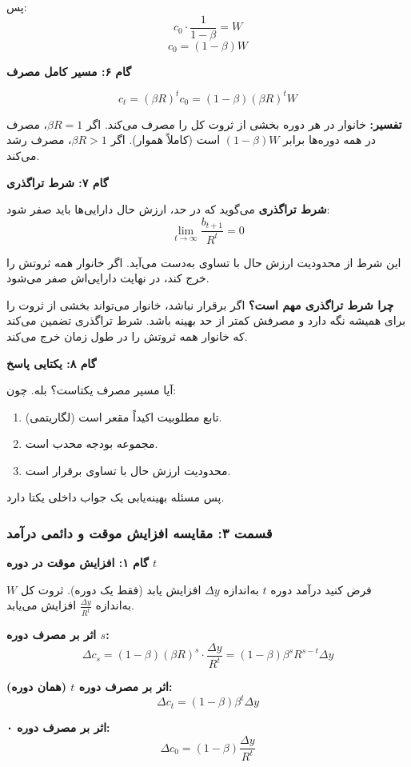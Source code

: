 \documentclass[12pt,a4paper]{article}
\begin{document}
پس:
\[
	c_0 \cdot \frac{1}{1-\beta} = W
\]
\[
	\boxed{c_0 = (1-\beta) W}
\]

\textbf{گام ۶: مسیر کامل مصرف}

\[
	\boxed{c_t = (\beta R)^t c_0 = (1-\beta)(\beta R)^t W}
\]

\textbf{تفسیر:} خانوار در هر دوره بخشی از ثروت کل را مصرف می‌کند. اگر $\beta R = 1$، مصرف در همه دوره‌ها برابر $(1-\beta)W$ است (کاملاً هموار). اگر $\beta R > 1$، مصرف رشد می‌کند.

\textbf{گام ۷: شرط تراگذری}

\textbf{شرط تراگذری} می‌گوید که در حد، ارزش حال دارایی‌ها باید صفر شود:
\[
	\lim_{t \to \infty} \frac{b_{t+1}}{R^t} = 0
\]

این شرط از محدودیت ارزش حال با تساوی به‌دست می‌آید. اگر خانوار همه ثروتش را خرج کند، در نهایت دارایی‌اش صفر می‌شود.

\textbf{چرا شرط تراگذری مهم است؟} اگر برقرار نباشد، خانوار می‌تواند بخشی از ثروت را برای همیشه نگه دارد و مصرفش کمتر از حد بهینه باشد. شرط تراگذری تضمین می‌کند که خانوار همه ثروتش را در طول زمان خرج می‌کند.

\textbf{گام ۸: یکتایی پاسخ}

آیا مسیر مصرف یکتاست؟ بله. چون:

\begin{enumerate}
	\item تابع مطلوبیت اکیداً مقعر است (لگاریتمی).
	\item مجموعه بودجه محدب است.
	\item محدودیت ارزش حال با تساوی برقرار است.
\end{enumerate}

پس مسئله بهینه‌یابی یک جواب داخلی یکتا دارد.

\subsubsection{قسمت ۳: مقایسه افزایش موقت و دائمی درآمد}

\textbf{گام ۱: افزایش موقت در دوره $t$}

فرض کنید درآمد دوره $t$ به‌اندازه $\Delta y$ افزایش یابد (فقط یک دوره). ثروت کل $W$ به‌اندازه $\frac{\Delta y}{R^t}$ افزایش می‌یابد.

\textbf{اثر بر مصرف دوره $s$:}
\[
	\Delta c_s = (1-\beta)(\beta R)^s \cdot \frac{\Delta y}{R^t} = (1-\beta) \beta^s R^{s-t} \Delta y
\]

\textbf{اثر بر مصرف دوره $t$ (همان دوره):}
\[
	\Delta c_t = (1-\beta) \beta^t \Delta y
\]

\textbf{اثر بر مصرف دوره ۰:}
\[
	\Delta c_0 = (1-\beta) \frac{\Delta y}{R^t}
\]
\end{document}
